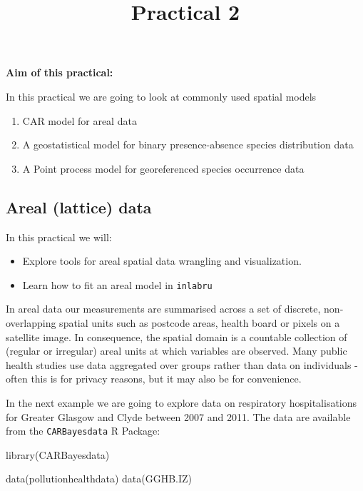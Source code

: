 \documentclass[
  letterpaper,
  DIV=11,
  numbers=noendperiod]{scrartcl}
\title{Practical 2}
\author{}
\date{}
\makeatletter
\newenvironment{Shaded}{\begin{snugshade}}{\end{snugshade}}
\newcommand{\FunctionTok}[1]{\textcolor[rgb]{0.28,0.35,0.67}{#1}}
\newcommand{\NormalTok}[1]{\textcolor[rgb]{0.00,0.23,0.31}{#1}}
\renewcommand{\maketitle}{\bgroup\setlength{\parindent}{0pt}
\begin{flushleft}
  {\sffamily\huge\textbf{\MakeUppercase{\@title}}} \vspace{0.3cm} \newline
  {\Large {\@subtitle}} \newline
  \@author
\end{flushleft}\egroup
}
\makeatother
\begin{document}
\maketitle

\pagestyle{mystyle}


\textbf{Aim of this practical:}

In this practical we are going to look at commonly used spatial models

\begin{enumerate}
\def\labelenumi{\arabic{enumi}.}
\item
  CAR model for areal data
\item
  A geostatistical model for binary presence-absence species
  distribution data
\item
  A Point process model for georeferenced species occurrence data
\end{enumerate}

\subsection{Areal (lattice) data}\label{sec-areal_data}

In this practical we will:

\begin{itemize}
\item
  Explore tools for areal spatial data wrangling and visualization.
\item
  Learn how to fit an areal model in \texttt{inlabru}
\end{itemize}

In areal data our measurements are summarised across a set of discrete,
non-overlapping spatial units such as postcode areas, health board or
pixels on a satellite image. In consequence, the spatial domain is a
countable collection of (regular or irregular) areal units at which
variables are observed. Many public health studies use data aggregated
over groups rather than data on individuals - often this is for privacy
reasons, but it may also be for convenience.

In the next example we are going to explore data on respiratory
hospitalisations for Greater Glasgow and Clyde between 2007 and 2011.
The data are available from the \texttt{CARBayesdata} R Package:

\begin{Shaded}
\begin{Highlighting}[]
\FunctionTok{library}\NormalTok{(CARBayesdata)}

\FunctionTok{data}\NormalTok{(pollutionhealthdata)}
\FunctionTok{data}\NormalTok{(GGHB.IZ)}
\end{Highlighting}
\end{Shaded}
\end{document}
